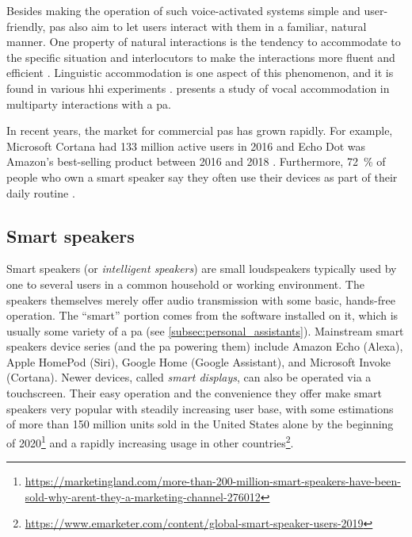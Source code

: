 Besides making the operation of such voice-activated systems simple and user-friendly, \acp{pa} also aim to let users interact with them in a familiar, natural manner.
One property of natural interactions is the tendency to accommodate to the specific situation and interlocutors to make the interactions more fluent and efficient \citep{Gallois2015CAT}.
Linguistic accommodation is one aspect of this phenomenon, and it is found in various \ac{hhi} experiments \citep[e.g.,][]{Pardo2017phonetic,Schweitzer2017social}.
 presents a study of vocal accommodation in multiparty interactions with a \ac{pa}.

In recent years, the market for commercial \acp{pa} has grown rapidly.
For example, Microsoft Cortana had 133 million active users in 2016 \citep{Osborne2016why} and Echo Dot was Amazon's best-selling product between 2016 and 2018 \citep{Dickey2017echo}.
Furthermore, \SI{72}{\percent} of people who own a smart speaker say they often use their devices as part of their daily routine \citep{Kleinberg2018ways}.

\subsection{Smart speakers}
\label{subsec:smart_speakers}

Smart speakers (or \emph{intelligent speakers}) are small loudspeakers typically used by one to several users in a common household or working environment.
The speakers themselves merely offer audio transmission with some basic, hands-free operation.
The \enquote{smart} portion comes from the software installed on it, which is usually some variety of a \ac{pa} (see \cref{subsec:personal_assistants}).
Mainstream smart speakers device series (and the \ac{pa} powering them) include Amazon Echo (Alexa), Apple HomePod (Siri), Google Home (Google Assistant), and Microsoft Invoke (Cortana).
Newer devices, called \emph{smart displays}, can also be operated via a touchscreen.
Their easy operation and the convenience they offer make smart speakers very popular with steadily increasing user base, with some estimations of more than 150 million units sold in the United States alone by the beginning of 2020\footnote{\url{https://marketingland.com/more-than-200-million-smart-speakers-have-been-sold-why-arent-they-a-marketing-channel-276012}} and a rapidly increasing usage in other countries\footnote{\url{https://www.emarketer.com/content/global-smart-speaker-users-2019}}.

